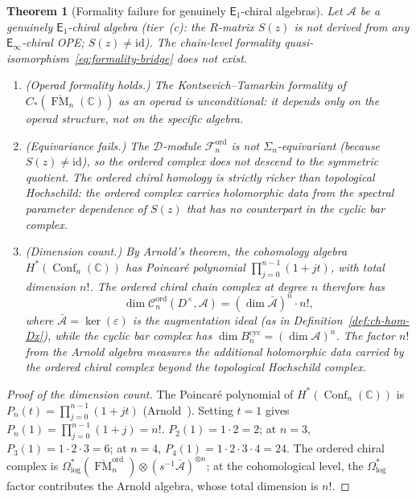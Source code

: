\documentclass[11pt,reqno]{amsart}
\newtheorem{theorem}{Theorem}[section]
\theoremstyle{definition}
\theoremstyle{remark}
\newcommand{\cA}{\mathcal{A}}
\newcommand{\cC}{\mathcal{C}}
\newcommand{\cD}{\mathcal{D}}
\newcommand{\cF}{\mathcal{F}}
\newcommand{\Eone}{\mathsf{E}_{1}}
\newcommand{\Einf}{\mathsf{E}_{\infty}}
\DeclareMathOperator{\Conf}{Conf}
\DeclareMathOperator{\FM}{FM}
\newcommand{\CC}{\mathbb{C}}
\newcommand{\id}{\mathrm{id}}
\numberwithin{equation}{section}
\begin{document}
\begin{theorem}[Formality failure for genuinely
$\Eone$-chiral algebras]
\label{thm:formality-failure}
Let $\cA$ be a genuinely $\Eone$-chiral algebra
\textup{(}tier~(c): the $R$-matrix $S(z)$ is not derived
from any $\Einf$-chiral OPE; $S(z) \neq \id$\textup{)}.
The chain-level formality
quasi-isomorphism~\eqref{eq:formality-bridge}
does \emph{not} exist.
\begin{enumerate}[label=\textup{(\roman*)}]
\item \textup{(Operad formality holds.)}
  The Kontsevich--Tamarkin formality of
  $C_*(\overline{\FM}_n(\CC))$ as an operad is
  unconditional: it depends only on the operad structure,
  not on the specific algebra.
\item \textup{(Equivariance fails.)}
  The $\cD$-module $\cF_n^{\mathrm{ord}}$ is not
  $\Sigma_n$-equivariant \textup{(}because
  $S(z) \neq \id$\textup{)}, so the ordered complex
  does \emph{not} descend to the symmetric quotient.
  The ordered chiral homology is strictly richer than
  topological Hochschild: the ordered complex carries
  holomorphic data from the spectral parameter
  dependence of $S(z)$ that has no counterpart in the
  cyclic bar complex.
\item \textup{(Dimension count.)}
  By Arnold's theorem, the cohomology algebra
  $H^*(\Conf_n(\CC))$ has Poincar\'e polynomial
  $\prod_{j=0}^{n-1}(1 + jt)$, with total dimension $n!$.
  The ordered chiral chain complex at degree $n$ therefore has
  \begin{equation}\label{eq:dim-count}
    \dim \cC_n^{\mathrm{ord}}(D^\times, \cA)
    = (\dim \bar{\cA})^n \cdot n!,
  \end{equation}
  where $\bar{\cA} = \ker(\varepsilon)$ is the augmentation
  ideal \textup{(}as in
  Definition~\textup{\ref{def:ch-hom-Dx}}\textup{)},
  while the cyclic bar complex has
  $\dim B^{\mathrm{cyc}}_n = (\dim \cA)^n$.
  The factor $n!$ from the Arnold algebra measures the
  additional holomorphic data carried by the ordered chiral
  complex beyond the topological Hochschild complex.
\end{enumerate}
\end{theorem}

\begin{proof}[Proof of the dimension count]
The Poincar\'e polynomial of $H^*(\Conf_n(\CC))$ is
$P_n(t) = \prod_{j=0}^{n-1}(1 + jt)$
(Arnold~\cite{Arnold69}). Setting $t = 1$ gives
$P_n(1) = \prod_{j=0}^{n-1}(1 + j) = n!$.
$P_2(1) = 1 \cdot 2 = 2$; at $n = 3$,
$P_3(1) = 1 \cdot 2 \cdot 3 = 6$; at $n = 4$,
$P_4(1) = 1 \cdot 2 \cdot 3 \cdot 4 = 24$.
The ordered chiral complex is
$\Omega^*_{\log}(\overline{\FM}_n^{\mathrm{ord}})
\otimes (s^{-1}\bar{\cA})^{\otimes n}$;
at the cohomological level, the
$\Omega^*_{\log}$ factor contributes the Arnold algebra,
whose total dimension is $n!$.
\end{proof}
\end{document}
